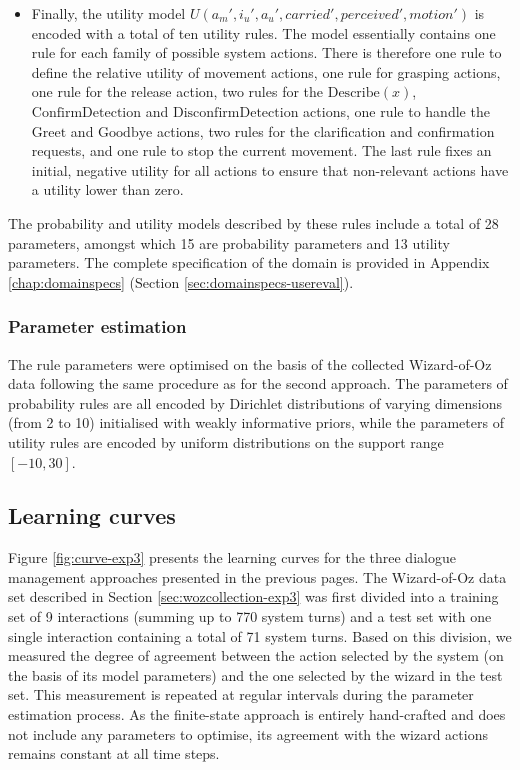 \begin{itemize}
\item Finally, the utility model $U(a_m', i_u', a_u', \mathit{carried'}, \mathit{perceived'}, \mathit{motion'})$ is encoded with a total of ten utility rules.  The model essentially contains one rule for each family of possible system actions.  There is therefore one rule to define the relative utility of movement actions, one rule for grasping actions, one rule for the release action, two rules for the $\mathrm{Describe(\mathit{x})}$, $\mathrm{ConfirmDetection}$ and $\mathrm{DisconfirmDetection}$ actions, one rule to handle the  $\mathrm{Greet}$ and $\mathrm{Goodbye}$ actions, two rules for the clarification and confirmation requests, and one rule to stop the current movement. The last rule fixes an initial, negative utility for all actions to ensure that non-relevant actions have a utility lower than zero.  

\end{itemize}

The probability and utility models described by these rules include a total of 28 parameters, amongst which 15 are probability parameters and 13 utility parameters.  The complete specification of the domain is provided in Appendix \ref{chap:domainspecs} (Section \ref{sec:domainspecs-usereval}). 

\subsubsection*{Parameter estimation}

The rule parameters were optimised on the basis of the collected Wizard-of-Oz data following the same procedure as for the second approach.  The parameters of probability rules are all encoded by Dirichlet distributions of varying dimensions (from 2 to 10) initialised with weakly informative priors, while the parameters of utility rules are encoded by uniform distributions on the support range $[-10, 30]$.  


\subsection{Learning curves}
\label{sec:learningcurve-exp3}

Figure \ref{fig:curve-exp3} presents the learning curves for the three dialogue management approaches presented in the previous pages. The Wizard-of-Oz data set described in Section \ref{sec:wozcollection-exp3} was first divided into a training set of 9 interactions (summing up to 770 system turns) and a test set with one single interaction containing a total of 71 system turns. Based on this division, we measured the degree of agreement between the action selected by the system (on the basis of its model parameters) and the one selected by the wizard in the test set. This measurement is repeated at regular intervals during the parameter estimation process.  As the finite-state approach is entirely hand-crafted and does not include any parameters to optimise, its agreement with the wizard actions remains constant at all time steps. 

